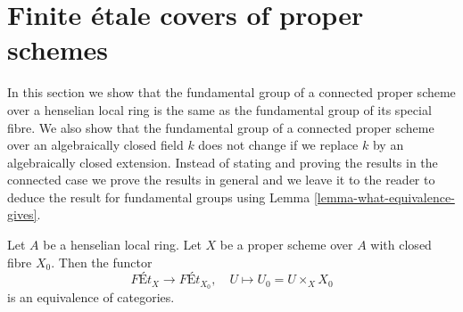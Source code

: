 \section{Finite \'etale covers of proper schemes}
\label{section-finite-etale-over-proper}

\noindent
In this section we show that the fundamental group of a connected proper
scheme over a henselian local ring is the same as the fundamental
group of its special fibre. We also show that the fundamental
group of a connected proper scheme over an algebraically closed field $k$
does not change if we replace $k$ by an algebraically closed extension.
Instead of stating and proving the results in the connected case
we prove the results in general and we leave it to the reader to deduce
the result for fundamental groups using
Lemma \ref{lemma-what-equivalence-gives}.

\begin{lemma}
\label{lemma-finite-etale-on-proper-over-henselian}
Let $A$ be a henselian local ring. Let $X$ be a proper scheme over $A$
with closed fibre $X_0$. Then the functor
$$
\textit{F\'Et}_X \to \textit{F\'Et}_{X_0},\quad
U \longmapsto U_0 = U \times_X X_0
$$
is an equivalence of categories.
\end{lemma}

